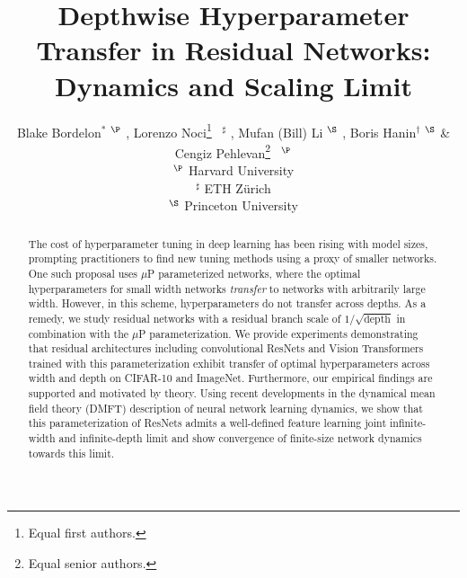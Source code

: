\documentclass{article} %
\title{Depthwise Hyperparameter Transfer in Residual Networks: Dynamics and Scaling Limit}
\author{Blake Bordelon$^{*}$ ${}^{\P}$
,  Lorenzo Noci\thanks{Equal first authors.} \ $^{\sharp}$
, Mufan (Bill) Li
$^{\S}$ , 
\text{ } Boris Hanin$^{\dagger}$ $^{\S}$ 
\& Cengiz Pehlevan\thanks{Equal senior authors.} \
$^{\P}$
\\
$^{\P}$  Harvard University \\
$^{\sharp}$ ETH Z{\"u}rich \\
${}^{\S}$ Princeton University\\
}
\newcommand{\lorenzo}[1]{\fTBD{\textcolor{olive}{[Lorenzo] #1}}}
\begin{document}
\maketitle

\begin{abstract}
% 
The cost of hyperparameter tuning in deep learning has been rising with model sizes, prompting practitioners to find new tuning methods using a proxy of smaller networks. 
% 
% 
One such proposal uses $\mu$P parameterized networks, where the optimal hyperparameters for small width networks \emph{transfer} to networks with arbitrarily large width. 
% 
However, in this scheme, hyperparameters do not transfer across depths. 
% 
As a remedy, we study residual networks with a residual branch scale of $1/\sqrt{\text{depth}}$ in combination with the $\mu$P parameterization.
% 
We provide experiments demonstrating that residual architectures including convolutional ResNets and Vision Transformers trained with this parameterization exhibit transfer of optimal hyperparameters across width and depth on CIFAR-10 and ImageNet. 
% 
Furthermore, our empirical findings are supported and motivated by theory. Using recent developments in the dynamical mean field theory (DMFT) description of neural network learning dynamics, we show that this parameterization of ResNets admits a well-defined feature learning joint infinite-width and infinite-depth limit and show convergence of finite-size network dynamics towards this limit. 
% 
% 
% 
% 
% 

% 
% 
\end{abstract}
\end{document}
